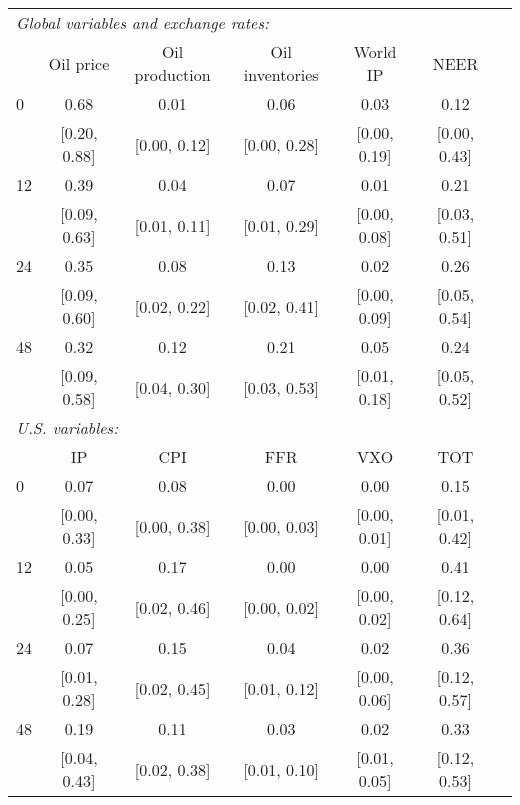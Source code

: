 \begin{tabular}{lcccccc}\toprule\midrule  
\multicolumn{6}{l}{\textit{Global variables and exchange rates:}} \\ 
 & Oil price & Oil production & Oil inventories & World IP & NEER  \\ \midrule  
 0 &     0.68 &     0.01 &     0.06 &     0.03 &     0.12  \\  
 & [0.20,    0.88] & [0.00,    0.12] & [0.00,    0.28] & [0.00,    0.19] & [0.00,    0.43] \\  
 12 &     0.39 &     0.04 &     0.07 &     0.01 &     0.21  \\  
 & [0.09,    0.63] & [0.01,    0.11] & [0.01,    0.29] & [0.00,    0.08] & [0.03,    0.51] \\  
 24 &     0.35 &     0.08 &     0.13 &     0.02 &     0.26  \\  
 & [0.09,    0.60] & [0.02,    0.22] & [0.02,    0.41] & [0.00,    0.09] & [0.05,    0.54] \\  
 48 &     0.32 &     0.12 &     0.21 &     0.05 &     0.24  \\  
 & [0.09,    0.58] & [0.04,    0.30] & [0.03,    0.53] & [0.01,    0.18] & [0.05,    0.52] \\[2ex] \midrule  
\multicolumn{6}{l}{\textit{U.S. variables:}} \\ 
 & IP & CPI & FFR & VXO & TOT  \\ \midrule  
 0 &     0.07 &     0.08 &     0.00 &     0.00 &     0.15  \\  
 & [0.00,    0.33] & [0.00,    0.38] & [0.00,    0.03] & [0.00,    0.01] & [0.01,    0.42] \\  
 12 &     0.05 &     0.17 &     0.00 &     0.00 &     0.41  \\  
 & [0.00,    0.25] & [0.02,    0.46] & [0.00,    0.02] & [0.00,    0.02] & [0.12,    0.64] \\  
 24 &     0.07 &     0.15 &     0.04 &     0.02 &     0.36  \\  
 & [0.01,    0.28] & [0.02,    0.45] & [0.01,    0.12] & [0.00,    0.06] & [0.12,    0.57] \\  
 48 &     0.19 &     0.11 &     0.03 &     0.02 &     0.33  \\  
 & [0.04,    0.43] & [0.02,    0.38] & [0.01,    0.10] & [0.01,    0.05] & [0.12,    0.53] \\  
\midrule\bottomrule 
\end{tabular}
